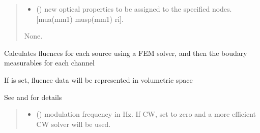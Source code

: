 \documentclass[letterpaper,10pt,english]{sphinxmanual}
\begin{document}
\begin{fulllineitems}
\begin{fulllineitems}
\begin{quote}
\begin{description}
\begin{itemize}
\item {} 
\sphinxAtStartPar
{} () \textendash{} new optical properties to be assigned to the specified nodes. {[}mua(mm\sphinxhyphen{}1) musp(mm\sphinxhyphen{}1) ri{]}.

\end{itemize}

\sphinxAtStartPar
None.

\end{description}\end{quote}

\end{fulllineitems}


\begin{fulllineitems}
\label{\detokenize{_autosummary/nirfasterff.base.stnd_mesh.stndmesh:nirfasterff.base.stnd_mesh.stndmesh.femdata}}
\pysigstartsignatures
\pysiglinewithargsret
{}
{\sphinxparamcomma {}\sphinxparamcomma {}}
{}
\pysigstopsignatures
\sphinxAtStartPar
Calculates fluences for each source using a FEM solver, and then the boudary measurables for each channel

\sphinxAtStartPar
If  is set, fluence data will be represented in volumetric space

\sphinxAtStartPar
See {\hyperref[\detokenize{_autosummary/nirfasterff.forward.femdata.femdata_stnd_CW:nirfasterff.forward.femdata.femdata_stnd_CW}]{}} and {\hyperref[\detokenize{_autosummary/nirfasterff.forward.femdata.femdata_stnd_FD:nirfasterff.forward.femdata.femdata_stnd_FD}]{}} for details
\begin{quote}\begin{description}
\begin{itemize}
\item {} 
\sphinxAtStartPar
{} () \textendash{} modulation frequency in Hz. If CW, set to zero and a more efficient CW solver will be used.


\end{itemize}
\end{description}
\end{quote}
\end{fulllineitems}
\end{fulllineitems}
\end{document}
